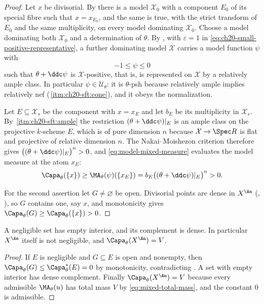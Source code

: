 \begin{proof}
Let $x$ be divisorial.  By  there is
a model $\mathcal X_0$ with a component $E_0$ of its special fibre such
that $x=x_{E_0}$, and the same is true, with the strict transform of
$E_0$ and the same multiplicity, on every model dominating
$\mathcal X_0$.  Choose a model dominating both $\mathcal X_0$ and a
determination of $\theta$.  By
, with $\varepsilon=1$ in
\eqref{eq:ch20-small-positive-representative}, a further dominating
model $\mathcal X$ carries a model function $\psi$ with
\[
                       -1\leq\psi\leq0
\]
such that $\theta+\ddc\psi$ is $\mathcal X$-positive, that is, is
represented on $\mathcal X$ by a relatively ample class.  In particular
$\psi\in\mathcal U_\theta$: it is $\theta$-psh because relatively ample
implies relatively nef
(\,\cref{itm:ch20-sft:cone}), and it obeys
the normalization.

Let $E\subseteq\mathcal X_s$ be the component with $x=x_E$ and let
$b_E$ be its multiplicity in $\mathcal X_s$.  By
\,\cref{itm:ch20-sft:ample} the restriction
$(\theta+\ddc\psi)|_E$ is an ample class on the projective $k$-scheme
$E$, which is of pure dimension $n$ because
$\mathcal X\to\Spec R$ is flat and projective of relative dimension $n$.
The Nakai--Moishezon criterion therefore gives
$\bigl((\theta+\ddc\psi)|_E\bigr)^n>0$, and
\eqref{eq:model-mixed-measure} evaluates the model measure at the atom
$x_E$:
\begin{equation}
\label{eq:ch25-divisorial-atom}
 \Capa_\theta(\{x\})\geq\MA_\theta(\psi)(\{x_E\})
 =b_E\bigl((\theta+\ddc\psi)|_E\bigr)^n>0 .
\end{equation}

For the second assertion let $G\neq\varnothing$ be open.  Divisorial points
are dense in $X^{\An}$
(, ),
so $G$ contains one, say $x$, and monotonicity gives
$\Capa_\theta(G)\geq\Capa_\theta(\{x\})>0$.
\end{proof}

\begin{corollary}
\label{cor:ch25-negligible-empty-interior}
A negligible set has empty interior, and its complement is dense.  In
particular $X^{\An}$ itself is not negligible, and
$\Capa_\theta(X^{\An})=V$.
\end{corollary}

\begin{proof}
If $E$ is negligible and $G\subseteq E$ is open and nonempty, then
$\Capa_\theta(G)\leq\Capa_\theta^*(E)=0$ by monotonicity, contradicting
.  A set with empty interior has dense
complement.  Finally $\Capa_\theta(X^{\An})=V$ because every admissible
$\MA_\theta(u)$ has total mass $V$ by
\eqref{eq:mixed-total-mass}, and the constant $0$ is admissible.
\end{proof}


